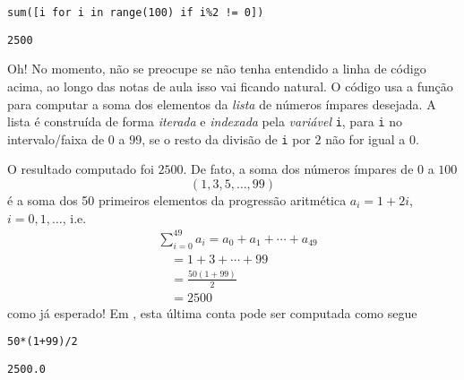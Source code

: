 \begin{lstlisting}
sum([i for i in range(100) if i%2 != 0])
\end{lstlisting}

\begin{verbatim}
2500
\end{verbatim}

Oh! No momento, não se preocupe se não tenha entendido a linha de código acima, ao longo das notas de aula isso vai ficando natural. O código usa a função {\PYTHONsum} para computar a soma dos elementos da \emph{lista} de números ímpares desejada. A lista é construída de forma \emph{iterada} e \emph{indexada} pela \emph{variável} \texttt{i}, para \texttt{i} no intervalo/faixa de $0$ a $99$, se o resto da divisão de \texttt{i} por $2$ não for igual a $0$. 

O resultado computado foi $2500$. De fato, a soma dos números ímpares de $0$ a $100$
\begin{equation}
  (1, 3, 5, \dotsc, 99)
\end{equation}
é a soma dos 50 primeiros elementos da progressão aritmética $a_i = 1 + 2i$, $i=0, 1, \ldots$, i.e.
\begin{align}
  & \sum_{i=0}^{49}a_i = a_0 + a_1 + \cdots + a_{49}\\
  & \text{}\quad = 1 + 3 + \cdots + 99\\
  & \text{}\quad = \frac{50(1 + 99)}{2}\\
  & \text{}\quad = 2500
\end{align}
como já esperado! Em {\python}, esta última conta pode ser computada como segue

\begin{lstlisting}
50*(1+99)/2
\end{lstlisting}

\begin{verbatim}
2500.0
\end{verbatim}
